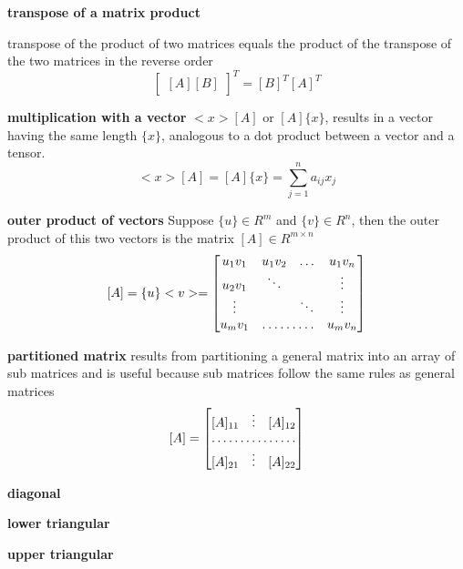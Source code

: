 \documentclass[letterpaper,reqno,oneside]{amsart}
\newenvironment{dd}[1]{
	\noindent
	\textbf{\normalsize{#1}}
	\hspace{0.1in}
	\small
	\rmfamily
	}
	{\medskip}
\begin{document}
\begin{dd}{transpose of a matrix product}
transpose of the product of two matrices equals the product of the transpose of the two matrices in the reverse order
\[
\begin{bmatrix}
[A][B]
\end{bmatrix}^T
 = [B]^T[A]^T \]
\end{dd}

\begin{dd}{multiplication with a vector} $<x>[A]$ or $[A]\{x\}$, results in a vector having the same length $\{x\}$, analogous to a dot product between a vector and a tensor.
$$<x>[A] = [A]\{x\}=\sum_{j=1}^n a_{ij} x_j$$

\end{dd}

\begin{dd}{outer product of vectors} Suppose $\{u\} \in R^m$ and $\{v\} \in R^n$, then the outer product of this two vectors is the matrix $[A] \in R^{m \times n}$
\[[A] = \{u\}<v> = 
	\begin{bmatrix}
	u_1 v_1 & u_1 v_2 & \hdots & u_1 v_n \\
	u_2 v_1 & \ddots & & \vdots\\
	\vdots & & \ddots & \vdots\\
	u_m v_1 & \hdotsfor{2} & u_m v_n
	\end{bmatrix}
	\]
\end{dd}

\begin{dd}{partitioned matrix} results from partitioning a general matrix into an array of sub matrices and is useful because sub matrices follow the same rules as general matrices
\[ [A] =
	\begin{bmatrix}
	[A]_{11} & \vdots & [A]_{12} \\
	\hdotsfor{3} \\
	[A]_{21} & \vdots &[A]_{22}\\
	\end{bmatrix}
	\]
\end{dd}

\begin{dd}{diagonal}

\end{dd}

\begin{dd}{lower triangular}

\end{dd}

\begin{dd}{upper triangular}

\end{dd}
\end{document}
